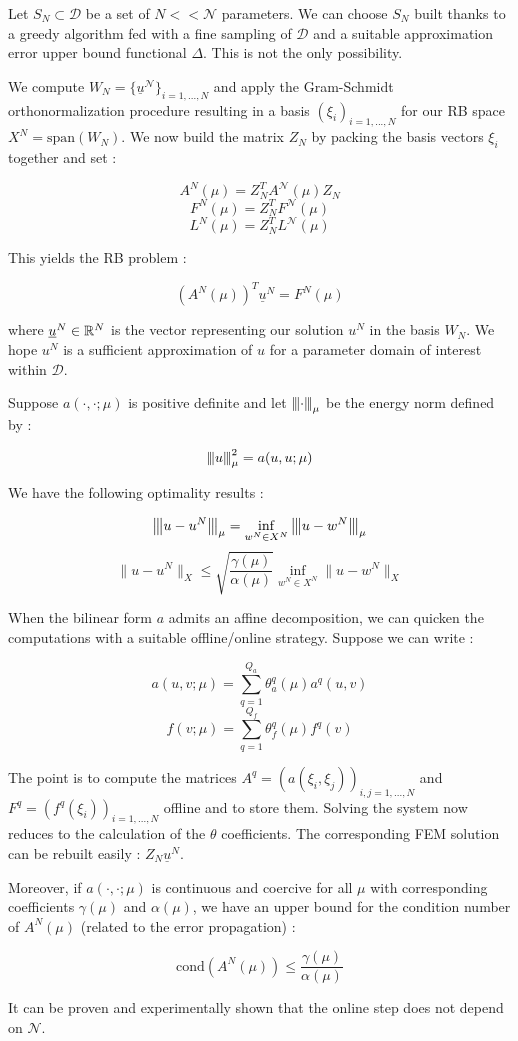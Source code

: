 \documentclass[a4paper]{article}
\begin{document}
Let $S_N\subset\mathcal D$ be a set of $N<<\mathcal N$ parameters. We can choose $S_N$ built thanks to a greedy algorithm fed with a fine sampling of $\mathcal D$ and a suitable approximation error upper bound functional $\Delta$. This is not the only possibility.


We compute $W_N=\{\underline u^\mathcal N\}_{i=1,...,N}$ and apply the Gram-Schmidt orthonormalization procedure resulting in a basis $\left(\xi_i\right)_{i=1,...,N}$ for our RB space $X^N=\text{span}\left(W_N\right)$. We now build the matrix $Z_N$ by packing the basis vectors $\xi_i$ together and set :

$$A^N(\mu)=Z_N^TA^\mathcal N(\mu)Z_N$$
$$F^N(\mu)=Z_N^TF^\mathcal N(\mu)$$
$$L^N(\mu)=Z_N^TL^\mathcal N(\mu)$$

This yields the RB problem :

$$\left(A^N(\mu)\right)^T\underline u^N=F^N(\mu)$$

\noindent where $\underline u^N\in\mathbb{R}^N$ is the vector representing our solution $u^N$ in the basis $W_N$. We hope $u^N$ is a sufficient approximation of $u$ for a parameter domain of interest within $\mathcal D$.


Suppose $a(\cdot,\cdot;\mu)$ is positive definite and let ${\left\vert\kern-0.25ex\left\vert\kern-0.25ex\left\vert \cdot\right\vert\kern-0.25ex\right\vert\kern-0.25ex\right\vert}_\mu$ be the energy norm defined by :

$${\left\vert\kern-0.25ex\left\vert\kern-0.25ex\left\vert u\right\vert\kern-0.25ex\right\vert\kern-0.25ex\right\vert}_\mu^2=a(u,u;\mu)$$

\newpage
\noindent We have the following optimality results :

$${\left\vert\kern-0.25ex\left\vert\kern-0.25ex\left\vert u-u^N\right\vert\kern-0.25ex\right\vert\kern-0.25ex\right\vert}_\mu=\inf_{w^N\in X^N}{\left\vert\kern-0.25ex\left\vert\kern-0.25ex\left\vert u-w^N\right\vert\kern-0.25ex\right\vert\kern-0.25ex\right\vert}_\mu$$
$$\|u-u^N\|_X\leq\sqrt{\frac{\gamma(\mu)}{\alpha(\mu)}}\inf_{w^N\in X^N}\|u-w^N\|_X$$

\bigskip

When the bilinear form $a$ admits an affine decomposition, we can quicken the computations with a suitable offline/online strategy. Suppose we can write :

$$a(u,v;\mu)=\sum_{q=1}^{Q_a}\theta^q_a(\mu)a^q(u,v)$$
$$f(v;\mu)=\sum_{q=1}^{Q_f}\theta^q_f(\mu)f^q(v)$$

The point is to compute the matrices $A^q=\left(a(\xi_i,\xi_j)\right)_{i,j=1,...,N}$ and $F^q=\left(f^q(\xi_i)\right)_{i=1,...,N}$ offline and to store them. Solving the system now reduces to the calculation of the $\theta$ coefficients. The corresponding FEM solution can be rebuilt easily : $Z_N\underline u^N$.


Moreover, if $a(\cdot,\cdot;\mu)$ is continuous and coercive for all $\mu$ with corresponding coefficients $\gamma(\mu)$ and $\alpha(\mu)$, we have an upper bound for the condition number of $A^N(\mu)$ (related to the error propagation) :

$$\text{cond}\left(A^N(\mu)\right)\leq\frac{\gamma(\mu)}{\alpha(\mu)}$$

It can be proven and experimentally shown that the online step does not depend on $\mathcal N$.
\end{document}
